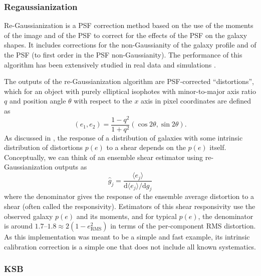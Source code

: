 \documentclass[iop]{emulateapj}
\begin{document}
\subsubsection{Regaussianization}

Re-Gaussianization \citep{2003MNRAS.343..459H} is a PSF correction
method based on the use of the moments of the image and of the PSF to
correct for the effects of the PSF on the galaxy shapes. It includes
corrections for the non-Gaussianity of the galaxy profile
\citep{2002AJ....123..583B,2003MNRAS.343..459H} and of the PSF (to
first order in the PSF non-Gaussianity). The performance of this
algorithm has been extensively studied in real data and simulations
\citep[e.g.,][]{2005MNRAS.361.1287M,2012MNRAS.420.1518M,2013MNRAS.432.1544M,2015MNRAS.450.2963M}. 

The outputs of the re-Gaussianization algorithm are PSF-corrected
``distortions'', which for an object with purely elliptical isophotes
with minor-to-major axis ratio $q$ and position angle $\theta$ with
respect to the $x$ axis in pixel coordinates are defined as
\begin{equation}
(e_1, e_2) = \frac{1-q^2}{1+q^2}\left(\cos{2\theta},\sin{2\theta}\right).
\end{equation}
As discussed in \cite{2002AJ....123..583B}, the response of a
distribution of galaxies with some intrinsic distribution of
distortions $p(e)$ to a shear %
depends on
the $p(e)$ itself.  Conceptually, we can think of an ensemble shear
estimator using re-Gaussianization outputs as
\begin{equation}
\hat{g}_j = \frac{\langle e_j\rangle}{\mathrm{d}\langle e_j\rangle/\mathrm{d}g_j}
\end{equation}
where the denominator gives the response of the ensemble average
distortion to a shear (often called the responsivity).  Estimators of
this shear responsivity use the observed galaxy $p(e)$ and its
moments, and for typical $p(e)$, the denominator is around
$1.7$--$1.8\approx 2 (1-e_\text{RMS}^2)$ in terms of the per-component
RMS distortion. As this implementation was meant to be a simple and
fast example, its intrinsic calibration correction is a simple one
that does not include all known systematics.


\subsubsection{KSB}
\end{document}
